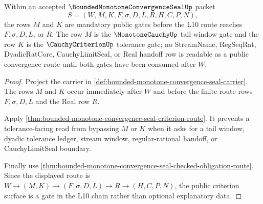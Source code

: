 \begin{theorem}
\label{thm:bounded-monotone-convergence-seal-criterion-scope}
Within an accepted $\BoundedMonotoneConvergenceSealUp$ packet
$$
S=(W,M,K,F,\sigma,D,L,R,H,C,P,N),
$$
the rows $M$ and $K$ are mandatory public gates before the L10 route reaches $F,\sigma,D,L$, or $R$. The row $M$ is the $\MonotoneCauchyUp$ tail-window gate and the row $K$ is the $\CauchyCriterionUp$ tolerance gate; no StreamName, RegSeqRat, DyadicRatCore, CauchyLimitSeal, or Real handoff row is readable as a public convergence route until both gates have been consumed after $W$.
\end{theorem}
\begin{proof}
Project the carrier in \autoref{def:bounded-monotone-convergence-seal-carrier}. The rows $M$ and $K$ occur immediately after $W$ and before the finite route rows $F,\sigma,D,L$ and the Real row $R$.

Apply \autoref{thm:bounded-monotone-convergence-seal-criterion-route}. It prevents a tolerance-facing read from bypassing $M$ or $K$ when it asks for a tail window, dyadic tolerance ledger, stream window, regular-rational handoff, or CauchyLimitSeal boundary.

Finally use \autoref{thm:bounded-monotone-convergence-seal-checked-obligation-route}. Since the displayed route is $W \to (M,K) \to (F,\sigma,D,L) \to R \to (H,C,P,N)$, the public criterion surface is a gate in the L10 chain rather than optional explanatory data.
\end{proof}

